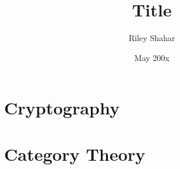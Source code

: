\documentclass[12pt,nobib,nohyper]{tufte-book}
\title{Title} %
\author{Riley Shahar}
\date{May 200x} %
\begin{document}
\maketitle
\frontmatter
\pagestyle{empty} %




\tableofcontents
\listoftables
\listoffigures



\mainmatter%
\pagestyle{fancyplain} %


\chapter{Cryptography}


\chapter{Category Theory}


\backmatter{}
\nocite{*}
\printbibliography

\end{document}
